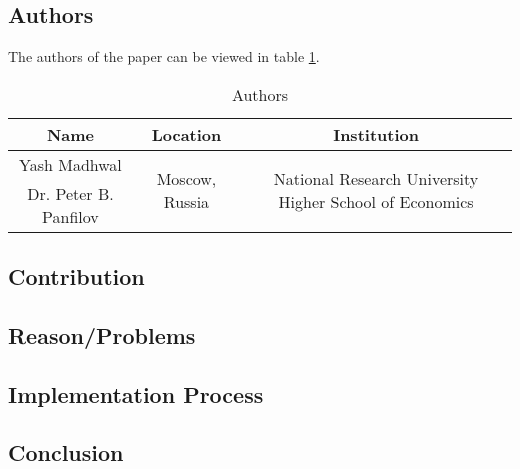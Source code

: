 \clearpage
\section*{\citet{2017_Madhwal}}

\subsection*{Authors}
The authors of the paper can be viewed in table \ref{tab:2017_Madhwal_Authors}.
\begin{longtable}{ |c|c|c| }
	\caption{Authors} \label{tab:2017_Madhwal_Authors} \\
	\hline
 	\cellcolor{Gray}Name & \cellcolor{Gray}Location & \cellcolor{Gray}Institution \\ [0.5ex] 
 	\hline\hline
 	\endhead
 	Yash Madhwal & \multirow{2}{*}{\centering Moscow, Russia} & \multirow{2}{*}{\parbox{5cm}{\centering National Research University Higher School of Economics}}  \\
	\cline{1-1}
	 Dr. Peter B. Panfilov &   &  \\
	 \hline
\end{longtable}


\subsection*{Contribution}



\subsection*{Reason/Problems}



\subsection*{Implementation Process}


\subsection*{Conclusion}

